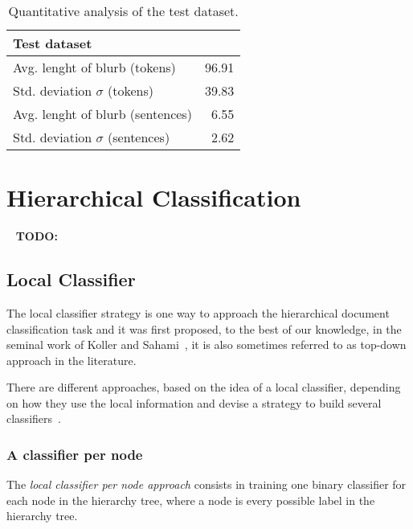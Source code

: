 \documentclass[11pt,a4paper]{article}
\begin{document}
\begin{table}
\begin{center}
\begin{tabular}{|l|r|}
\hline\centering\textbf{Test dataset}  &         \\
\hline
Avg. lenght of blurb (tokens)              &  96.91             \\
Std. deviation $\sigma$ (tokens)           &  39.83             \\
Avg. lenght of blurb (sentences)           &  6.55              \\
Std. deviation $\sigma$ (sentences)        &  2.62              \\
\hline
\end{tabular}
\end{center}
\caption{\label{quantitivy-analysis-test}Quantitative analysis of the test dataset.}
\end{table}




\section{Hierarchical Classification}\label{hierarchical-clf}


\ \newline
\textbf{TODO:}
\ \newline


\subsection{Local Classifier}

The local classifier strategy is one way to approach the hierarchical document classification task
and it was first proposed, to the best of our knowledge, in the seminal work of Koller and
Sahami~, it is also sometimes referred to as top-down
approach in the literature.

There are different approaches, based on the idea of a local classifier, depending on how they use
the local information and devise a strategy to build several classifiers~\cite{Silla:2011:SHC:1937796.1937884}.


\subsubsection{A classifier per node} %
The \textit{local classifier per node approach} consists in training one binary classifier for each
node in the hierarchy tree, where a node is every possible label in the hierarchy tree.
\end{document}

